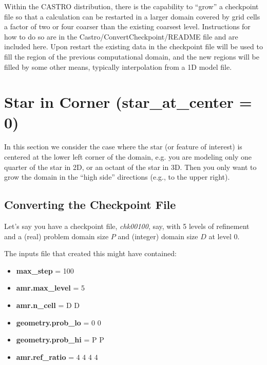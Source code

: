 
Within the CASTRO distribution, there is the capability to ``grow'' a checkpoint file so 
that a calculation can be restarted in a larger domain covered by grid cells a factor of
two or four coarser than the existing coarsest level.  Instructions for how to
do so are in the Castro/ConvertCheckpoint/README file and are included here.
Upon restart the existing data in the checkpoint file will be used to fill the region of the previous 
computational domain, and the new regions will be filled by some other means, typically
interpolation from a 1D model file.

\section{Star in Corner ({\bf star\_at\_center = 0}) }

In this section we consider the case where the star (or feature of interest) 
is centered at the lower left corner of the domain, e.g. you are modeling only one 
quarter of the star in 2D, or an octant of the star in 3D.  Then you only want
to grow the domain in the ``high side'' directions (e.g., to the upper right).

\subsection{Converting the Checkpoint File}

Let's say you have a checkpoint file, {\em chk00100},  say, with 5 levels of refinement 
and a (real) problem domain size $P$ and (integer) domain size $D$ at level 0.  

The inputs file that created this might have contained:

\begin{itemize}

\item {\bf max\_step}      = 100

\item {\bf amr.max\_level} = 5

\item {\bf amr.n\_cell}    = D D

\item {\bf geometry.prob\_lo} = 0 0

\item {\bf geometry.prob\_hi} = P P

\item {\bf amr.ref\_ratio}    = 4 4 4 4

\end{itemize}

